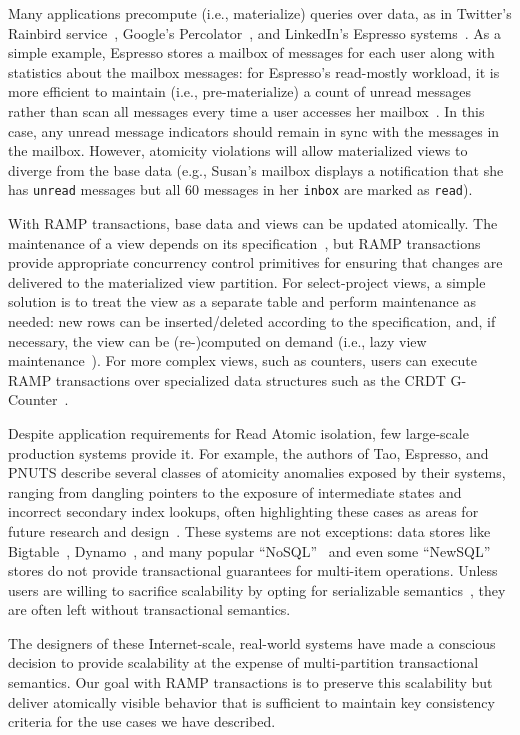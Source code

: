  Many applications
precompute (i.e., materialize) queries over data, as in Twitter's
Rainbird service~\cite{rainbird}, Google's
Percolator~\cite{percolator}, and LinkedIn's Espresso
systems~\cite{espresso}. As a simple example, Espresso stores a
mailbox of messages for each user along with statistics about the
mailbox messages: for Espresso's read-mostly workload, it is more
efficient to maintain (i.e., pre-materialize) a count of unread
messages rather than scan all messages every time a user accesses her
mailbox~\cite{espresso}. In this case, any unread message indicators
should remain in sync with the messages in the mailbox. However,
atomicity violations will allow materialized views to diverge from the
base data (e.g., Susan's mailbox displays a notification that she has
\texttt{unread} messages but all $60$ messages in her
\texttt{inbox} are marked as \texttt{read}).

With RAMP transactions, base data and views can be updated
atomically. The maintenance of a view depends on its
specification~\cite{materialized-survey,hyun-integrity,mv1}, but RAMP
transactions provide appropriate concurrency control primitives for
ensuring that changes are delivered to the materialized view
partition. For select-project views, a simple solution is to treat the
view as a separate table and perform maintenance as needed: new rows
can be inserted/deleted according to the specification, and, if
necessary, the view can be (re-)computed on demand (i.e., lazy view
maintenance~\cite{lazy-view}). For more complex views, such as
counters, users can execute RAMP transactions over specialized data
structures such as the CRDT G-Counter~\cite{crdt}.

 Despite application requirements for
Read Atomic isolation, few large-scale production systems provide
it. For example, the authors of Tao, Espresso, and PNUTS describe
several classes of atomicity anomalies exposed by their systems,
ranging from dangling pointers to the exposure of intermediate states
and incorrect secondary index lookups, often highlighting these cases
as areas for future research and
design~\cite{tao,espresso,pnuts}. These systems are not exceptions:
data stores like Bigtable~\cite{bigtable}, Dynamo~\cite{dynamo}, and
many popular ``NoSQL''~\cite{mohan-note} and even some
``NewSQL''~\cite{hat-vldb} stores do not provide transactional
guarantees for multi-item operations. Unless users are willing to
sacrifice scalability by opting for serializable
semantics~\cite{spanner}, they are often left without transactional
semantics.

The designers of these Internet-scale, real-world systems have made a
conscious decision to provide scalability at the expense of
multi-partition transactional semantics. Our goal with RAMP
transactions is to preserve this scalability but deliver atomically
visible behavior that is sufficient to maintain key consistency
criteria for the use cases we have described.
